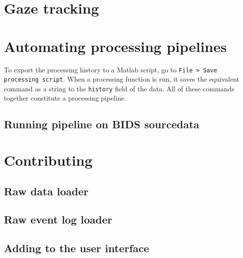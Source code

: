 \documentclass{article}
\begin{document}
\section{Gaze tracking}

\section{Automating processing pipelines}
To export the processing history to a Matlab script, go to \texttt{File > Save processing script}. When a processing function is run, it saves the equivalent command as a string to the \texttt{history} field of the data. All of these commands together constitute a processing pipeline.
\subsection{Running pipeline on BIDS sourcedata}

\section{Contributing}
\subsection{Raw data loader}
\subsection{Raw event log loader}
\subsection{Adding to the user interface}
\end{document}
